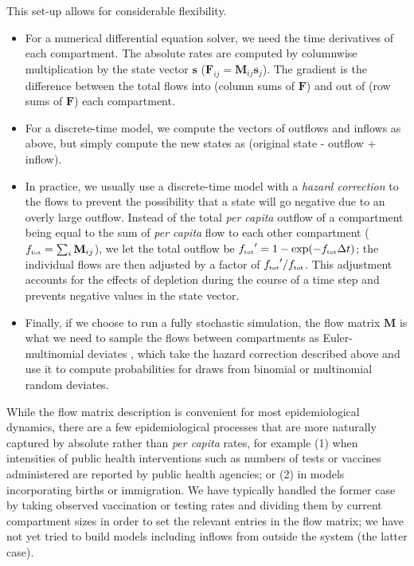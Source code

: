 \documentclass[12pt]{article}\usepackage[]{graphicx}\usepackage[]{color}
\begin{document}
This set-up allows for considerable flexibility.
\begin{itemize}
\item For a numerical differential equation solver, we need the time derivatives
  of each compartment. The absolute rates are computed by columnwise multiplication by the state vector
  $\mathbf s$ (${\mathbf F}_{ij} = \mathbf{M}_{ij} \mathbf{s}_j$).
  The gradient is the difference between the total flows into
  (column sums of $\mathbf F$) and out of (row sums of $\mathbf F$) each compartment.
\item For a discrete-time model, we compute the vectors of outflows and inflows as above,
  but simply compute the new states as (original state - outflow + inflow).
\item In practice, we usually use a discrete-time model with a \emph{hazard correction} to
  the flows to prevent the possibility that a state will go negative due to an overly
  large outflow. Instead of the total \emph{per capita} outflow of a compartment being
  equal to the sum of \emph{per capita} flow to each other compartment (${{f}_{\textrm{\tiny tot}}} = \sum_i {\mathbf M}_{ij}$),
  we let the total outflow be ${{f}_{\textrm{\tiny tot}}}' = 1-\exp(-{{f}_{\textrm{\tiny tot}}} \Delta t)$; the individual flows are then adjusted by a factor of ${{f}_{\textrm{\tiny tot}}}'/{{f}_{\textrm{\tiny tot}}}$.
  This adjustment accounts for
  the effects of depletion during the course of a time step and prevents negative values
  in the state vector.
\item Finally, if we choose to run a fully stochastic simulation, the flow matrix $\mathbf M$ is
  what we need to sample the flows between compartments as Euler-multinomial deviates \cite{breto+09}, which take the
  hazard correction described above and use it to compute probabilities for draws from binomial or multinomial random deviates.
\end{itemize}

While the flow matrix description is convenient for most epidemiological dynamics, there are a few
epidemiological processes that are more naturally captured by absolute rather than \emph{per capita} rates,
for example (1) when intensities of public health interventions such as numbers of tests or
vaccines administered are reported by public health agencies;
or (2) in models incorporating births or immigration.
We have typically handled the former case by taking observed vaccination or testing rates and
dividing them by current compartment sizes in order to set the relevant entries in the flow matrix;
we have not yet tried to build models including inflows from outside the system (the latter case).
\end{document}
